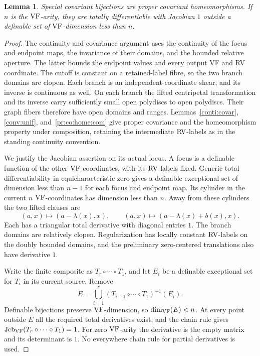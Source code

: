 \documentclass[12pt]{amsart}
\theoremstyle{plain}
\newtheorem{lem}[thm]{Lemma}
\theoremstyle{definition}
\theoremstyle{remark}
\numberwithin{equation}{section}
\theoremstyle{plain}
\newcommand{\VF}{\textup{VF}}
\newcommand{\RV}{\textup{RV}}
\DeclareMathOperator{\jcb}{Jcb}
\newcommand{\0}{\emptyset}
\begin{document}
\begin{lem}\label{spec:inve}
Special covariant bijections are proper covariant homeomorphisms. If $n$ is the $\VF$-arity, they are totally differentiable with Jacobian $1$ outside a definable set of $\VF$-dimension less than $n$.
\end{lem}
\begin{proof}
The continuity and covariance argument uses the continuity of the focus and endpoint maps, the invariance of their domains, and the bounded relative aperture. The latter bounds the endpoint values and every output VF and RV coordinate. The cutoff is constant on a retained-label fibre, so the two branch domains are clopen. Each branch is an independent-coordinate shear, and its inverse is continuous as well. On each branch the lifted centripetal transformation and its inverse carry sufficiently small open polydiscs to open polydiscs. Their graph fibers therefore have open domains and ranges. Lemmas~\ref{conti:covar}, \ref{conv:unif}, and~\ref{pr:co:home:com} give proper covariance and the homeomorphism property under composition, retaining the intermediate $\RV$-labels as in the standing continuity convention.

We justify the Jacobian assertion on its actual locus. A focus is a definable function of the other $\VF$-coordinates, with its $\RV$-labels fixed. Generic total differentiability in equicharacteristic zero gives a definable exceptional set of dimension less than $n-1$ for each focus and endpoint map. Its cylinder in the current $n$ $\VF$-coordinates has dimension less than $n$. Away from these cylinders the two lifted clauses are
\[
(a,x)\longmapsto(a-\lambda(x),x),\qquad
(a,x)\longmapsto(a-\lambda(x)+b(x),x).
\]
Each has a triangular total derivative with diagonal entries $1$. The branch domains are relatively clopen. Regularization has locally constant $\RV$-labels on the doubly bounded domains, and the preliminary zero-centered translations also have derivative $1$.

Write the finite composite as $T_r\circ\cdots\circ T_1$, and let $E_i$ be a definable exceptional set for $T_i$ in its current source. Remove
\[
E=\bigcup_{i=1}^{r}(T_{i-1}\circ\cdots\circ T_1)^{-1}(E_i).
\]
Definable bijections preserve $\VF$-dimension, so $\dim_{\VF}(E)<n$. At every point outside $E$ all the required total derivatives exist, and the chain rule gives $\jcb_{\VF}(T_r\circ\cdots\circ T_1)=1$. For zero $\VF$-arity the derivative is the empty matrix and its determinant is $1$. No everywhere chain rule for partial derivatives is used.
\end{proof}
\end{document}
